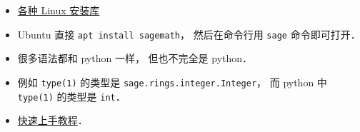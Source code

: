 
\begin{issues}
\issueDraft
\end{issues}

\begin{itemize}
\item \href{https://repology.org/project/sagemath/versions}{各种 Linux 安装库}
\item Ubuntu 直接 \verb|apt install sagemath|， 然后在命令行用 \verb|sage| 命令即可打开．
\item 很多语法都和 python 一样， 但也不完全是 python．
\item 例如 \verb|type(1)| 的类型是 \verb|sage.rings.integer.Integer|， 而 python 中 \verb|type(1)| 的类型是 \verb|int|．
\item \href{https://www.sagemath.org/tour-quickstart.html}{快速上手教程}．
\end{itemize}

